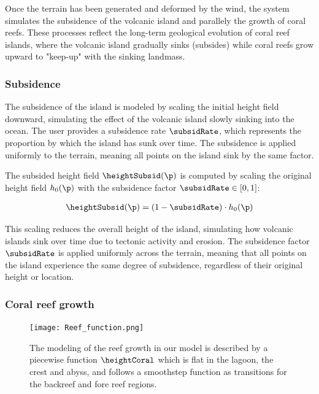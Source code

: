 Once the terrain has been generated and deformed by the wind, the system simulates the subsidence of the volcanic island and parallely the growth of coral reefs. These processes reflect the long-term geological evolution of coral reef islands, where the volcanic island gradually sinks (subsides) while coral reefs grow upward to "keep-up" with the sinking landmass.

\subsubsection{Subsidence}
\label{sec:coral-island_subsidence}

The subsidence of the island is modeled by scaling the initial height field downward, simulating the effect of the volcanic island slowly sinking into the ocean. The user provides a subsidence rate $\subsidRate$, which represents the proportion by which the island has sunk over time. The subsidence is applied uniformly to the terrain, meaning all points on the island sink by the same factor.

The subsided height field $\heightSubsid(\p)$ is computed by scaling the original height field $h_0(\p)$ with the subsidence factor $\subsidRate \in [0, 1]$:

\begin{align}
    \heightSubsid(\p) = (1 - \subsidRate) \cdot h_0(\p)
\end{align}

This scaling reduces the overall height of the island, simulating how volcanic islands sink over time due to tectonic activity and erosion. The subsidence factor $\subsidRate$ is applied uniformly across the terrain, meaning that all points on the island experience the same degree of subsidence, regardless of their original height or location.

\subsubsection{Coral reef growth}
\label{sec:coral-island_reef-growth}

\begin{figure}[H]
    \texttt{[image: Reef\_function.png]}
    \caption{The modeling of the reef growth in our model is described by a piecewise function $\heightCoral$ which is flat in the lagoon, the crest and abyss, and follows a smoothstep function as transitions for the backreef and fore reef regions. }
    \label{fig:coral-island_reef-function}
\end{figure}

